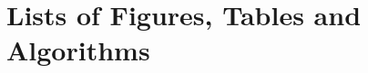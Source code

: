 \nocite{*}
\printbibliography

\chapter{Lists of Figures, Tables and Algorithms}
\listoffigures
\listoftables
\begingroup
    \let\chapter\section
    \listofalgorithms
\endgroup

